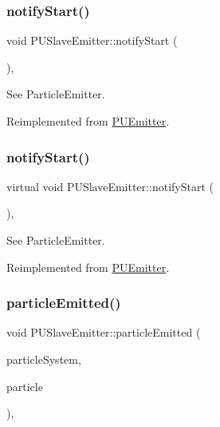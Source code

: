 \subsubsection{\texorpdfstring{notify\+Start()}{notifyStart()}\hspace{0.1cm}{\footnotesize\ttfamily [1/2]}}
{\footnotesize\ttfamily void P\+U\+Slave\+Emitter\+::notify\+Start (\begin{DoxyParamCaption}\item[{void}]{ }\end{DoxyParamCaption})\hspace{0.3cm}{\ttfamily [override]}, {\ttfamily [virtual]}}

See Particle\+Emitter. 

Reimplemented from \hyperlink{classPUEmitter}{P\+U\+Emitter}.

\mbox{\label{classPUSlaveEmitter_aaac4e3c04133147bd475cdd7963fac48}} 
\subsubsection{\texorpdfstring{notify\+Start()}{notifyStart()}\hspace{0.1cm}{\footnotesize\ttfamily [2/2]}}
{\footnotesize\ttfamily virtual void P\+U\+Slave\+Emitter\+::notify\+Start (\begin{DoxyParamCaption}\item[{void}]{ }\end{DoxyParamCaption})\hspace{0.3cm}{\ttfamily [override]}, {\ttfamily [virtual]}}

See Particle\+Emitter. 

Reimplemented from \hyperlink{classPUEmitter}{P\+U\+Emitter}.

\mbox{\label{classPUSlaveEmitter_acdfc2f0ae29f95c260d1d34afdf7fa61}} 
\subsubsection{\texorpdfstring{particle\+Emitted()}{particleEmitted()}\hspace{0.1cm}{\footnotesize\ttfamily [1/2]}}
{\footnotesize\ttfamily void P\+U\+Slave\+Emitter\+::particle\+Emitted (\begin{DoxyParamCaption}\item[{\hyperlink{classPUParticleSystem3D}{P\+U\+Particle\+System3D} $\ast$}]{particle\+System,  }\item[{\hyperlink{structPUParticle3D}{P\+U\+Particle3D} $\ast$}]{particle }\end{DoxyParamCaption})\hspace{0.3cm}{\ttfamily [override]}, {\ttfamily [virtual]}}

